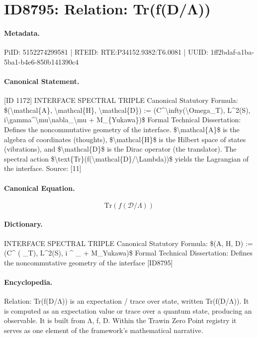 \section*{ID8795: Relation: Tr(f(D/Λ))}
\paragraph{Metadata.}
PiID: 5152274299581 | RTEID: RTE:P34152.9382:T6.0081 | UUID: 1ff2bdaf-a1ba-5ba1-b4e6-850b141390c4

\paragraph{Canonical Statement.}
[ID 1172] INTERFACE SPECTRAL TRIPLE Canonical Statutory Formula: \$(\textbackslash{}mathcal\{A\}, \textbackslash{}mathcal\{H\}, \textbackslash{}mathcal\{D\}) := (C\textasciicircum{}\textbackslash{}infty(\textbackslash{}Omega\_T), L\textasciicircum{}2(S), i\textbackslash{}gamma\textasciicircum{}\textbackslash{}mu\textbackslash{}nabla\_\textbackslash{}mu + M\_\{Yukawa\})\$ Formal Technical Dissertation: Defines the noncommutative geometry of the interface. \$\textbackslash{}mathcal\{A\}\$ is the algebra of coordinates (thoughts), \$\textbackslash{}mathcal\{H\}\$ is the Hilbert space of states (vibrations), and \$\textbackslash{}mathcal\{D\}\$ is the Dirac operator (the translator). The spectral action \$\textbackslash{}text\{Tr\}(f(\textbackslash{}mathcal\{D\}/\textbackslash{}Lambda))\$ yields the Lagrangian of the interface. Source: [11]

\paragraph{Canonical Equation.}
\[
\text{Tr}(f(\mathcal{D}/\Lambda))
\]

\paragraph{Dictionary.}
INTERFACE SPECTRAL TRIPLE Canonical Statutory Formula: \$(A, H, D) := (C\textasciicircum{} ( \_T), L\textasciicircum{}2(S), i \textasciicircum{} \_ + M\_Yukawa)\$ Formal Technical Dissertation: Defines the noncommutative geometry of the interface [ID8795]

\paragraph{Encyclopedia.}
Relation: Tr(f(D/Λ)) is an expectation / trace over state, written Tr(f(D/Λ)). It is computed as an expectation value or trace over a quantum state, producing an observable. It is built from Λ, f, D. Within the Trawin Zero Point registry it serves as one element of the framework's mathematical narrative.
